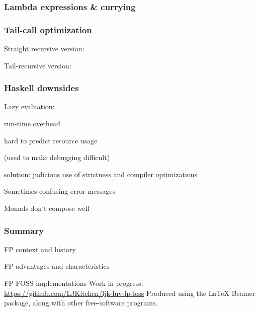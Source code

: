 \begin{frame}
\frametitle{Lambda expressions \& currying}



\end{frame}

\begin{frame}
\frametitle{Tail-call optimization}
Straight recursive version:

Tail-recursive version:

\end{frame}

\begin{frame}
\frametitle{Haskell downsides}
\bi
\item Lazy evaluation:
\bi
\item run-time overhead
\item hard to predict resource usage
\item (used to make debugging difficult)
\item solution: judicious use of strictness and compiler optimizations
\ei
\item Sometimes confusing error messages
\item Monads don't compose well
\ei
\end{frame}

\begin{frame}
\frametitle{Summary}
\bi
\item FP context and history
\item FP advantages and characteristics
\item FP FOSS implementations
\ei
Work in progress: \\
{\small \url{https://github.com/LJKitchen/ljk-luv-fp-foss}}
\medskip
{\scriptsize Produced using the {\LaTeX} Beamer package, along
  with other free-software programs.}
\end{frame}


